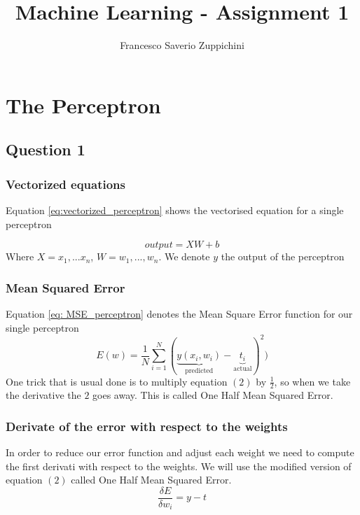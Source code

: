 \documentclass[11pt]{article}
\author{Francesco Saverio Zuppichini}
\title{Machine Learning - Assignment 1}
\begin{document}
\maketitle

\section{The Perceptron}
\subsection{Question 1}
\subsubsection{Vectorized equations}
Equation \ref{eq:vectorized_perceptron} shows the vectorised equation for a single perceptron

\begin{equation}
\label{eq:vectorized_perceptron}
output = XW + b
\end{equation}
Where $X = {x_1, ... x_n}$, $W = {w_1, ..., w_n}$. We denote $y$ the output of the perceptron

\subsubsection{Mean Squared Error}
Equation \ref{eq: MSE_perceptron} denotes the Mean Square Error function for our single perceptron
\begin{equation}
\label{eq: MSE_perceptron}
	E(w) = \frac{1}{N}\sum_{i = 1}^N(\underbrace{y(x_i,w_i)}_{\text{predicted}} - \underbrace{t_i}_{\text{actual}})^2)
\end{equation}
One trick that is usual done is to multiply equation $(2)$ by $\frac{1}{2}$, so when we take the derivative the $2$ goes away. This is called One Half Mean Squared Error.

\subsubsection{Derivate of the error with respect to the weights}
In order to reduce our error function and adjust each weight we need to compute the first derivati with respect to the weights. We will use the modified version of equation $(2)$ called One Half Mean Squared Error.
\begin{equation}
\frac{\delta E}{\delta w_i}	= y - t
\end{equation}
\end{document}
